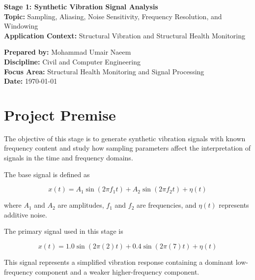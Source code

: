 \documentclass[11pt,a4paper]{article}
\begin{document}
\begin{titlepage}
    \centering
    \vspace*{2cm}

    {\Large \textbf{Stage 1: Synthetic Vibration Signal Analysis}}\\[0.4cm]

    \textbf{Topic:} Sampling, Aliasing, Noise Sensitivity, Frequency Resolution, and Windowing\\[0.3cm]
    \textbf{Application Context:} Structural Vibration and Structural Health Monitoring\\[2cm]

    \vfill

    \begin{flushleft}
    \textbf{Prepared by:} Mohammad Umair Naeem\\
    \textbf{Discipline:} Civil and Computer Engineering\\
    \textbf{Focus Area:} Structural Health Monitoring and Signal Processing\\
    \textbf{Date:} \today
    \end{flushleft}
\end{titlepage}

\tableofcontents
\newpage

\section{Project Premise}

The objective of this stage is to generate synthetic vibration signals with known frequency content and study how sampling parameters affect the interpretation of signals in the time and frequency domains.

The base signal is defined as

\begin{equation}
x(t) = A_1 \sin(2\pi f_1 t) + A_2 \sin(2\pi f_2 t) + \eta(t)
\end{equation}

where \(A_1\) and \(A_2\) are amplitudes, \(f_1\) and \(f_2\) are frequencies, and \(\eta(t)\) represents additive noise.

The primary signal used in this stage is

\begin{equation}
x(t) = 1.0\sin(2\pi(2)t) + 0.4\sin(2\pi(7)t) + \eta(t)
\end{equation}

This signal represents a simplified vibration response containing a dominant low-frequency component and a weaker higher-frequency component.
\end{document}
